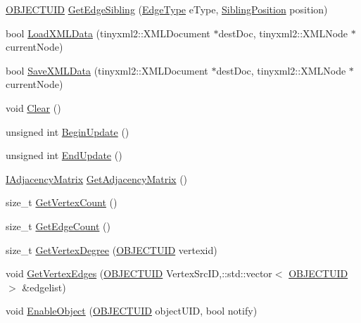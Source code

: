 \begin{DoxyCompactItemize}
\item 
\hyperlink{_object_database_defines_8h_a164ec120b01429b93c9cd0bef2a67e64}{O\+B\+J\+E\+C\+T\+U\+I\+D} \hyperlink{class_c_object_database_a029a3dc8a83f184ae785d7be1e81fbb3}{Get\+Edge\+Sibling} (\hyperlink{_object_database_defines_8h_a424a64da753a3cd5e96ab8d0553a04c4}{Edge\+Type} e\+Type, \hyperlink{_object_database_defines_8h_a9507b0b115184061c7002f25c82fc6d7}{Sibling\+Position} position)
\item 
bool \hyperlink{class_c_object_database_a7c7fbf4adf110d18cc81bc5ec8c55ae2}{Load\+X\+M\+L\+Data} (tinyxml2\+::\+X\+M\+L\+Document $\ast$dest\+Doc, tinyxml2\+::\+X\+M\+L\+Node $\ast$current\+Node)
\item 
bool \hyperlink{class_c_object_database_a51194193be949a369d971a6acc63ebc4}{Save\+X\+M\+L\+Data} (tinyxml2\+::\+X\+M\+L\+Document $\ast$dest\+Doc, tinyxml2\+::\+X\+M\+L\+Node $\ast$current\+Node)
\item 
void \hyperlink{class_c_object_database_aee3ac7ac97950a082cfa3e6925e4f8aa}{Clear} ()
\item 
unsigned int \hyperlink{class_c_object_database_a3e897451a54d47966f8de1eee37062aa}{Begin\+Update} ()
\item 
unsigned int \hyperlink{class_c_object_database_a3b0b9540c90abfd007f657546e9ed7da}{End\+Update} ()
\item 
\hyperlink{class_i_adjacency_matrix}{I\+Adjacency\+Matrix} \hyperlink{class_c_object_database_abcb416613289bdbb30bf7c84832b78df}{Get\+Adjacency\+Matrix} ()
\item 
size\+\_\+t \hyperlink{class_c_object_database_ad321df9f3e265412663711c3c4d1c16c}{Get\+Vertex\+Count} ()
\item 
size\+\_\+t \hyperlink{class_c_object_database_a2af534c449f0637162063ee72080fbc3}{Get\+Edge\+Count} ()
\item 
size\+\_\+t \hyperlink{class_c_object_database_acb12aeadc82d7d64523a251b35154514}{Get\+Vertex\+Degree} (\hyperlink{_object_database_defines_8h_a164ec120b01429b93c9cd0bef2a67e64}{O\+B\+J\+E\+C\+T\+U\+I\+D} vertexid)
\item 
void \hyperlink{class_c_object_database_a7a813d22a36465e8fb77a3b18bd2a2f9}{Get\+Vertex\+Edges} (\hyperlink{_object_database_defines_8h_a164ec120b01429b93c9cd0bef2a67e64}{O\+B\+J\+E\+C\+T\+U\+I\+D} Vertex\+Src\+I\+D,\+::std\+::vector$<$ \hyperlink{_object_database_defines_8h_a164ec120b01429b93c9cd0bef2a67e64}{O\+B\+J\+E\+C\+T\+U\+I\+D} $>$ \&edgelist)
\item 
void \hyperlink{class_c_object_database_a0b63943450c88148db6584257afd55a0}{Enable\+Object} (\hyperlink{_object_database_defines_8h_a164ec120b01429b93c9cd0bef2a67e64}{O\+B\+J\+E\+C\+T\+U\+I\+D} object\+U\+I\+D, bool notify)

\end{DoxyCompactItemize}
